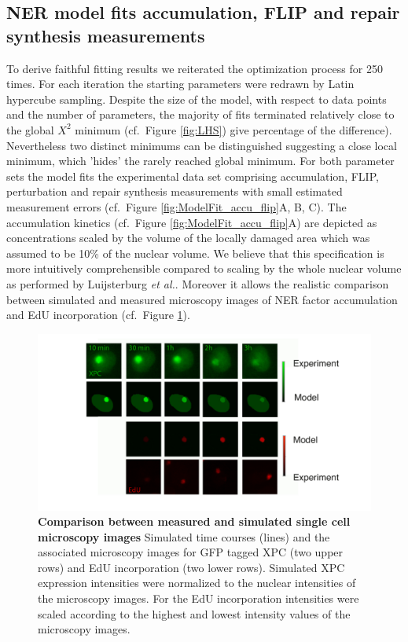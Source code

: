 \subsection{NER model fits accumulation, FLIP and repair synthesis measurements}    

To derive faithful fitting results we reiterated the optimization process for 250 times. For each iteration the starting parameters were redrawn by Latin hypercube sampling. Despite the size of the model, with respect to data points and the number of parameters, the majority of fits terminated relatively close to the global $X^2$ minimum (cf.\ Figure \ref{fig:LHS}) give percentage of the difference). Nevertheless two distinct minimums can be distinguished suggesting a close local minimum, which 'hides' the rarely reached global minimum. For both parameter sets the model fits the experimental data set comprising accumulation, FLIP, perturbation and repair synthesis measurements with small estimated measurement errors (cf.\ Figure \ref{fig:ModelFit_accu_flip}A, B, C). The accumulation kinetics (cf.\ Figure \ref{fig:ModelFit_accu_flip}A) are depicted as concentrations scaled by the volume of the locally damaged area which was assumed to be 10\% of the nuclear volume. We believe that this specification is more intuitively comprehensible  compared to scaling by the whole nuclear volume as performed by Luijsterburg \textit{et al.}\cite{Luijsterburg2010}. Moreover it allows the realistic comparison between simulated and measured microscopy images of NER factor accumulation and EdU incorporation (cf.\ Figure \ref{fig:Fitt_accu_Mic}).  

\begin{figure}[htbp]
\begin{center}
\includegraphics[width=1\textwidth]{Abbildungen/figure2_6_2.pdf}
\caption{\textbf{Comparison between measured and simulated single cell microscopy images} Simulated time courses (lines) and the associated microscopy images for GFP tagged XPC (two upper rows) and EdU incorporation (two lower rows). Simulated XPC expression intensities were normalized to the nuclear intensities of the microscopy images. For the EdU incorporation intensities were scaled according to the highest and lowest intensity values of the microscopy images.}
\label{fig:Fitt_accu_Mic}
\end{center}
\end{figure}

